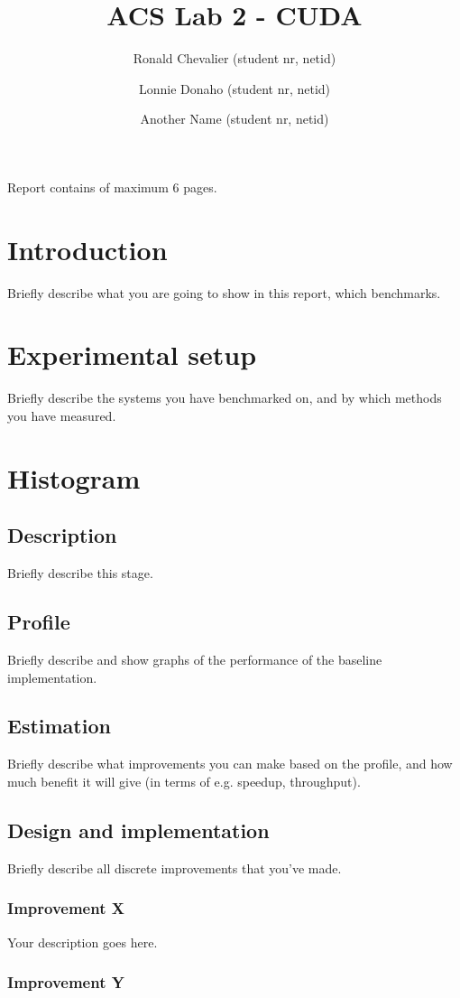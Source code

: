 \documentclass[twocolumn]{article}
\title{\large{\textbf{ACS Lab 2 - CUDA}}}
\author{
    \small Ronald Chevalier (student nr, netid)
    \and \small Lonnie Donaho (student nr, netid)
    \and \small Another Name (student nr, netid)
}
\date{}
\begin{document}
\maketitle

\begin{center}
    \footnotesize{Report contains \pageref{LastPage} of maximum 6 pages.}
\end{center}

\section{Introduction}
Briefly describe what you are going to show in this report, which benchmarks.

\section{Experimental setup}
Briefly describe the systems you have benchmarked on, and by which methods you have measured.

\section{Histogram}
\subsection{Description}
Briefly describe this stage.
\subsection{Profile}
Briefly describe and show graphs of the performance of the baseline implementation.
\subsection{Estimation}
Briefly describe what improvements you can make based on the profile, and how much benefit it will give (in terms of e.g. speedup, throughput).
\subsection{Design and implementation}
Briefly describe all discrete improvements that you've made.
\subsubsection{Improvement X}
Your description goes here.
\subsubsection{Improvement Y}
\end{document}
